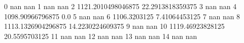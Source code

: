 0 nan nan
1 nan nan
2 1121.2010498046875 22.2913818359375
3 nan nan
4 1098.90966796875 0.0
5 nan nan
6 1106.3203125 7.41064453125
7 nan nan
8 1113.1326904296875 14.2230224609375
9 nan nan
10 1119.46923828125 20.5595703125
11 nan nan
12 nan nan
13 nan nan
14 nan nan
